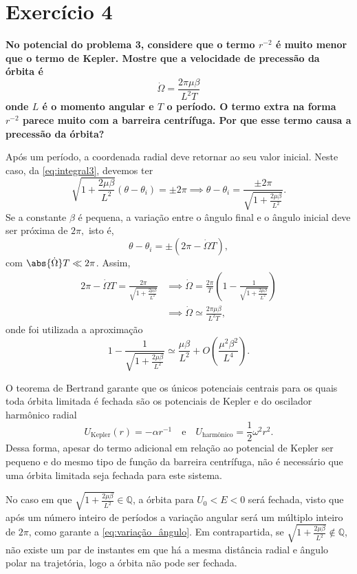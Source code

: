 \section*{Exercício 4}
\textbf{No potencial do problema 3, considere que o termo \(r^{-2}\) é muito menor que o termo de Kepler. Mostre que a velocidade de precessão da órbita é}
\begin{equation*}
    \dot\Omega = \frac{2\pi\mu\beta}{L^2T}
\end{equation*}
\textbf{onde \(L\) é o momento angular e \(T\) o período. O termo extra na forma \(r^{-2}\) parece muito com a barreira centrífuga. Por que esse termo causa a precessão da órbita?}

Após um período, a coordenada radial deve retornar ao seu valor inicial. Neste caso, da \cref{eq:integral3}, devemos ter
\begin{equation}
    \sqrt{1 + \frac{2\mu\beta}{L^2}}\left(\theta - \theta_i\right) = \pm2\pi \implies \theta - \theta_i = \frac{\pm 2\pi}{\sqrt{1 + \frac{2\mu\beta}{L^2}}}.
\end{equation}
Se a constante \(\beta\) é pequena, a variação entre o ângulo final e o ângulo inicial deve ser próxima de \(2\pi,\) isto é,
\begin{equation}
    \theta - \theta_i = \pm(2\pi - \dot\Omega T),
\end{equation}
com \(\abs{\dot\Omega} T \ll 2\pi\). Assim,
\begin{align}
    2\pi - \dot\Omega T = \frac{2\pi}{\sqrt{1 + \frac{2\mu\beta}{L^2}}} &\implies \dot\Omega = \frac{2\pi}{T}\left(1 - \frac{1}{\sqrt{1 + \frac{2\mu\beta}{L^2}}}\right)\\
                                                                        &\implies \dot\Omega \simeq \frac{2\pi\mu\beta}{L^2T}\label{eq:variação_ângulo},
\end{align}
onde foi utilizada a aproximação
\begin{equation}
    1 - \frac{1}{\sqrt{1 + \frac{2\mu\beta}{L^2}}} \simeq \frac{\mu\beta}{L^2} + O\left(\frac{\mu^2\beta^2}{L^4}\right).
\end{equation}

O teorema de Bertrand garante que os únicos potenciais centrais para os quais toda órbita limitada é fechada são os potenciais de Kepler e do oscilador harmônico radial
\begin{equation}
    U_{\mathrm{Kepler}}(r) = -\alpha r^{-1}\quad\text{e}\quad U_{\text{harmônico}} = \frac12\omega^2r^2.
\end{equation}
Dessa forma, apesar do termo adicional em relação ao potencial de Kepler ser pequeno e do mesmo tipo de função da barreira centrífuga, não é necessário que uma órbita limitada seja fechada para este sistema.

No caso em que \(\sqrt{1 + \frac{2\mu\beta}{L^2}} \in \mathbb{Q}\), a órbita para \(U_0 < E < 0\) será fechada, visto que após um número inteiro de períodos a variação angular será um múltiplo inteiro de \(2\pi\), como garante a \cref{eq:variação_ângulo}. Em contrapartida, se \(\sqrt{1 + \frac{2\mu\beta}{L^2}}\notin \mathbb{Q}\), não existe um par de instantes em que há a mesma distância radial e ângulo polar na trajetória, logo a órbita não pode ser fechada.
